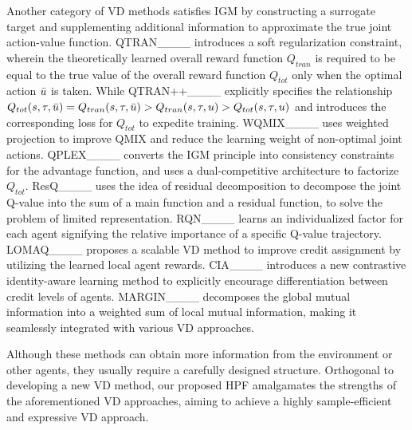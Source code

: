 Another category of VD methods satisfies IGM by constructing a surrogate target and supplementing additional information to approximate the true joint action-value function.
QTRAN____ introduces a soft regularization constraint, wherein the theoretically learned overall reward function $Q_{tran}$ is required to be equal to the true value of the overall reward function $Q_{tot}$ only when the optimal action $\Bar{u}$ is taken. 
While QTRAN++____ explicitly specifies the relationship $Q_{tot}(s,\tau,\Bar{u})=Q_{tran}(s,\tau,\Bar{u})>Q_{tran}(s,\tau,u)>Q_{tot}(s,\tau,u)$ and introduces the corresponding loss for $Q_{tot}$ to expedite training. WQMIX____ uses weighted projection to improve QMIX and reduce the learning weight of non-optimal joint actions. QPLEX____ converts the IGM principle into consistency constraints for the advantage function, and uses a dual-competitive architecture to factorize $Q_{tot}$. ResQ____ uses the idea of residual decomposition to decompose the joint Q-value into the sum of a main function and a residual function, to solve the problem of limited representation.
RQN____ learns an individualized factor for each agent signifying the relative importance of a specific Q-value trajectory.
LOMAQ____ proposes a scalable VD method to improve credit assignment by utilizing the learned local agent rewards. 
CIA____ introduces a new contrastive identity-aware learning method to explicitly encourage differentiation between credit levels of agents.
MARGIN____ decomposes the global mutual information into a weighted sum of local mutual information, making it seamlessly integrated with various VD approaches.

Although these methods can obtain more information from the environment or other agents, they usually require a carefully designed structure.
Orthogonal to developing a new VD method, our proposed HPF amalgamates the strengths of the aforementioned VD approaches, aiming to achieve a highly sample-efficient and expressive VD approach.